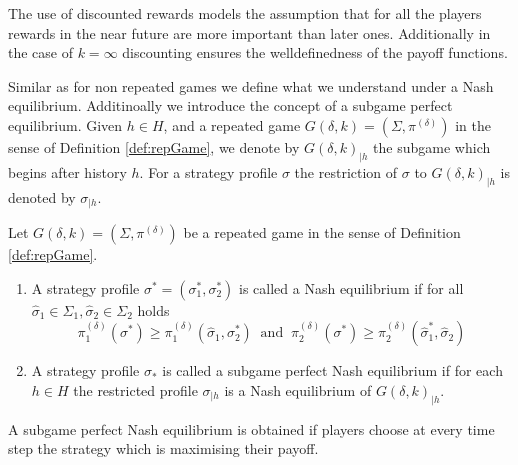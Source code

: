 \begin{remark}
    The use of discounted rewards models the assumption that for all the players rewards in the near future are more important than later ones. Additionally
    in the case of $k = \infty$ discounting ensures the welldefinedness of the payoff functions.
\end{remark}

Similar as for non repeated games we define what we understand under a Nash equilibrium. Additinoally we introduce the concept of a subgame perfect equilibrium. Given
$h\in H$, and a repeated game $G(\delta, k) = (\Sigma, \pi^{(\delta)})$ in the sense of Definition \ref{def:repGame}, we denote by $G(\delta, k)_{|h}$ the subgame 
which begins after history $h$. For a strategy profile $\sigma$ the restriction of $\sigma$ to $G(\delta, k)_{|h}$ is denoted by $\sigma_{|h}$.
\begin{definition}
    Let $G(\delta, k) = (\Sigma, \pi^{(\delta)})$ be a repeated game in the sense of Definition \ref{def:repGame}.
    \begin{enumerate}
        \item A strategy profile $\sigma^{*} = (\sigma_{1}^{*}, \sigma_{2}^{*})$ is called a Nash equilibrium if for all
            $\hat{\sigma}_{1}\in\Sigma_{1}, \hat{\sigma}_{2}\in\Sigma_{2}$ holds
            \begin{equation*}
                \pi_{1}^{(\delta)}(\sigma^{*})\geq \pi_{1}^{(\delta)}(\hat{\sigma}_{1}, \sigma_{2}^{*}) ~\text{ and }~
                \pi_{2}^{(\delta)}(\sigma^{*})\geq \pi_{2}^{(\delta)}(\hat{\sigma}_{1}^{*}, \hat{\sigma}_{2})
            \end{equation*}
        \item A strategy profile $\sigma_{*}$ is called a subgame perfect Nash equilibrium if for each $h\in H$ the restricted profile
            $\sigma_{|h}$ is a Nash equilibrium of $G(\delta, k)_{|h}$.
    \end{enumerate}
\end{definition}

\begin{remark}
    A subgame perfect Nash equilibrium is obtained if players choose at every time step the strategy which is maximising their payoff. 
\end{remark}

